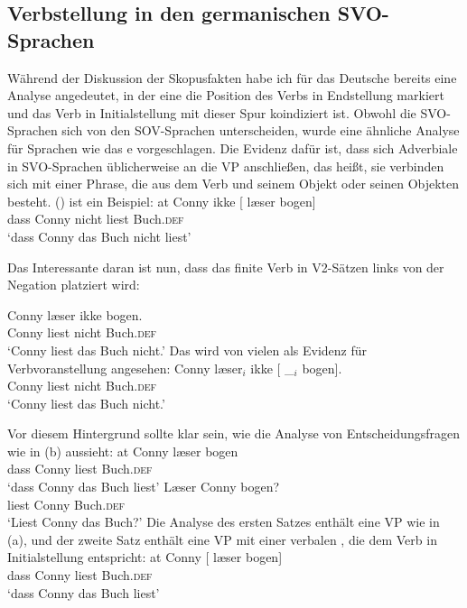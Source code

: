 \subsection{Verbstellung in den germanischen SVO-Sprachen}
\label{sec-danish-verb-movement}\label{sec-Germanic-SVO-verb-position}

Während der Diskussion der Skopusfakten habe ich für das Deutsche bereits eine Analyse angedeutet, in der eine  die
Position des Verbs in Endstellung markiert und das Verb in Initialstellung mit dieser
Spur koindiziert ist. Obwohl die SVO-Sprachen sich von den SOV-Sprachen unterscheiden, wurde eine ähnliche Analyse für Sprachen
wie das e vorgeschlagen. Die Evidenz dafür ist, dass sich Adverbiale in SVO-Sprachen üblicherweise an die VP anschließen,
das heißt, sie verbinden sich mit einer Phrase, die aus dem Verb und seinem Objekt oder seinen Objekten besteht. () ist
ein Beispiel:
\ea
\gll  at   Conny ikke [ læser bogen]\\
      dass Conny nicht      {}        liest          Buch.\textsc{def}\\\danish
\glt `dass Conny das Buch nicht liest'
\z

\noindent
Das Interessante daran ist nun, dass das finite Verb in V2-Sätzen links von der Negation platziert wird:

\ea
\gll  Conny læser ikke bogen.\\
       Conny liest   nicht  Buch.\textsc{def}\\\danish
\glt `Conny liest das Buch nicht.'
\z
Das wird von vielen als Evidenz für Verbvoranstellung angesehen:
\ea
\gll  Conny læser$_i$ ikke [ \_$_i$ bogen].\\
      Conny liest      nicht  {} {}    Buch.\textsc{def}\\\danish
\glt `Conny liest das Buch nicht.'
\z
\nocite{KS2002a}

\noindent
Vor diesem Hintergrund sollte klar sein, wie die Analyse von Entscheidungsfragen wie in (b) aussieht:
\eal
\ex
\gll at Conny læser bogen\\
     dass Conny liest Buch.\textsc{def}\\\danish
\glt `dass Conny das Buch liest'
\ex\label{ex-laeser-jens-bogen}
\gll Læser Conny bogen?\\
     liest Conny Buch.\textsc{def}\\
\glt `Liest Conny das Buch?'
\zl
Die Analyse des ersten Satzes enthält eine VP wie in (a), und der zweite Satz enthält eine
VP mit einer verbalen , die dem Verb in Initialstellung entspricht:
\eal
\ex
\gll at Conny [ læser bogen]\\
     dass Conny {} liest Buch.\textsc{def}\\\danish
\glt `dass Conny das Buch liest'

